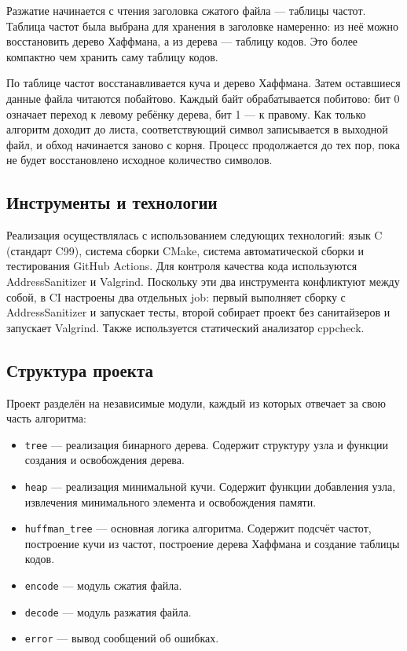 \documentclass[a4paper]{article}
\begin{document}
Разжатие начинается с чтения заголовка сжатого файла --- таблицы частот. Таблица частот была выбрана для хранения в заголовке намеренно: из неё можно восстановить дерево Хаффмана, а из дерева --- таблицу кодов. Это более компактно чем хранить саму таблицу кодов.

По таблице частот восстанавливается куча и дерево Хаффмана. Затем оставшиеся данные файла читаются побайтово. Каждый байт обрабатывается побитово: бит 0 означает переход к левому ребёнку дерева, бит 1 --- к правому. Как только алгоритм доходит до листа, соответствующий символ записывается в выходной файл, и обход начинается заново с корня. Процесс продолжается до тех пор, пока не будет восстановлено исходное количество символов.

\subsection*{Инструменты и технологии}

Реализация осуществлялась с использованием следующих технологий: язык C (стандарт C99), система сборки CMake, система автоматической сборки и тестирования GitHub Actions. Для контроля качества кода используются AddressSanitizer и Valgrind. Поскольку эти два инструмента конфликтуют между собой, в CI настроены два отдельных job: первый выполняет сборку с AddressSanitizer и запускает тесты, второй собирает проект без санитайзеров и запускает Valgrind. Также используется статический анализатор cppcheck.


\subsection*{Структура проекта}

Проект разделён на независимые модули, каждый из которых отвечает за свою часть алгоритма:

\begin{itemize}
    \item \texttt{tree} --- реализация бинарного дерева. Содержит структуру узла и функции создания и освобождения дерева.
    \item \texttt{heap} --- реализация минимальной кучи. Содержит функции добавления узла, извлечения минимального элемента и освобождения памяти.
    \item \texttt{huffman\_tree} --- основная логика алгоритма. Содержит подсчёт частот, построение кучи из частот, построение дерева Хаффмана и создание таблицы кодов.
    \item \texttt{encode} --- модуль сжатия файла.
    \item \texttt{decode} --- модуль разжатия файла.
    \item \texttt{error} --- вывод сообщений об ошибках.
\end{itemize}
\end{document}
